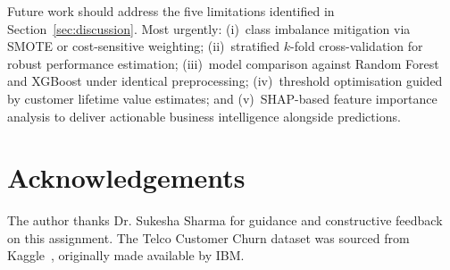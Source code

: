 \documentclass{llncs}
\begin{document}
Future work should address the five limitations identified in
Section~\ref{sec:discussion}.
Most urgently: (i)~class imbalance mitigation via SMOTE or cost-sensitive
weighting; (ii)~stratified $k$-fold cross-validation for robust performance
estimation; (iii)~model comparison against Random Forest and XGBoost under
identical preprocessing; (iv)~threshold optimisation guided by customer
lifetime value estimates; and (v)~SHAP-based feature importance analysis
to deliver actionable business intelligence alongside predictions.

\section*{Acknowledgements}
The author thanks Dr. Sukesha Sharma for guidance and constructive feedback
on this assignment.
The Telco Customer Churn dataset was sourced from
Kaggle~\cite{kaggle_telco}, originally made available by IBM.
\end{document}
